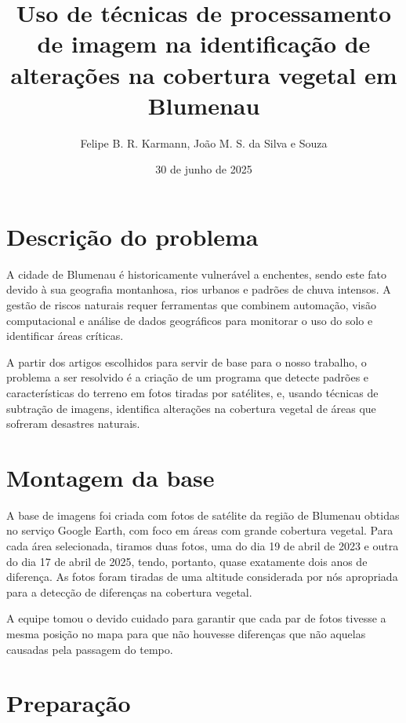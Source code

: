 \documentclass{article}
\author{Felipe B. R. Karmann, João M. S. da Silva e Souza}
\date{30 de junho de 2025}
\title{Uso de técnicas de processamento de imagem na identificação de alterações na cobertura vegetal em Blumenau}
\begin{document}
\maketitle

\section{Descrição do problema}

A cidade de Blumenau é historicamente vulnerável a enchentes, sendo este fato devido à sua geografia montanhosa, rios urbanos e padrões de chuva intensos. A gestão de riscos naturais requer ferramentas que combinem automação, visão computacional e análise de dados geográficos para monitorar o uso do solo e identificar áreas críticas.

A partir dos artigos escolhidos para servir de base para o nosso trabalho, o problema a ser resolvido é a criação de um programa que detecte padrões e características do terreno em fotos tiradas por satélites, e, usando técnicas de subtração de imagens, identifica alterações na cobertura vegetal de áreas que sofreram desastres naturais.

\section{Montagem da base}

A base de imagens foi criada com fotos de satélite da região de Blumenau obtidas no serviço Google Earth, com foco em áreas com grande cobertura vegetal. Para cada área selecionada, tiramos duas fotos, uma do dia 19 de abril de 2023 e outra do dia 17 de abril de 2025, tendo, portanto, quase exatamente dois anos de diferença. As fotos foram tiradas de uma altitude considerada por nós apropriada para a detecção de diferenças na cobertura vegetal.

A equipe tomou o devido cuidado para garantir que cada par de fotos tivesse a mesma posição no mapa para que não houvesse diferenças que não aquelas causadas pela passagem do tempo.

\section{Preparação}
\end{document}
